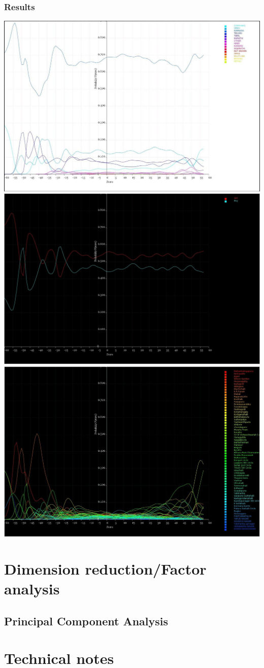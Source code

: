 \documentclass[10pt]{article}
\begin{document}
\subsubsection{Results}
\includegraphics[width=160mm]{ReportMedia/BayesLanguageFromImprovement.jpg}
\newpage
\includegraphics[width=160mm]{ReportMedia/BayesGenderFromImprovement.jpg}
\newpage
\includegraphics[width=160mm]{ReportMedia/BayesClusterFromImprovement.jpg}
\newpage
\section{Dimension reduction/Factor analysis}
\newpage
\subsection{Principal Component Analysis}

\newpage
\section{Technical notes}
\end{document}
